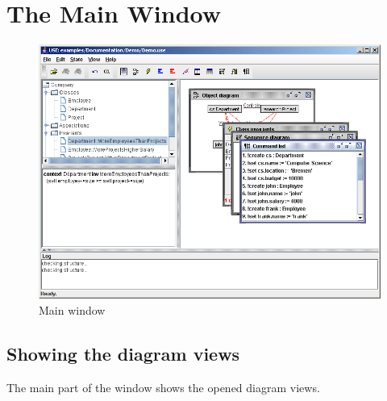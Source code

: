 \documentclass[a4paper,titlepage,oneside,final]{scrreprt} %
\begin{document}
\section{The Main Window}
\begin{figure}[ht]
\centering
\includegraphics[scale=0.5]{Screenshots/GUI/Views/MainWindow.png}
\caption{Main window}
\label{fig:MainWindow}
\end{figure}
\subsection{Showing the diagram views}
The main part of the window shows the opened diagram views.
\end{document}
